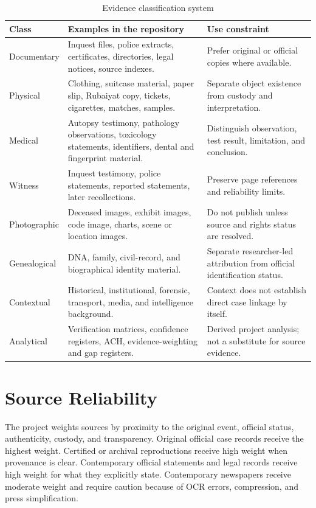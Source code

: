 \begin{table}[htbp]
\centering
\caption{Evidence classification system}
\label{tab:sources-evidence-classification}
\begin{tabularx}{\textwidth}{p{}X p{}}
\toprule
Class & Examples in the repository & Use constraint \\
\midrule
Documentary & Inquest files, police extracts, certificates, directories, legal notices, source indexes. & Prefer original or official copies where available. \\
Physical & Clothing, suitcase material, paper slip, Rubaiyat copy, tickets, cigarettes, matches, samples. & Separate object existence from custody and interpretation. \\
Medical & Autopsy testimony, pathology observations, toxicology statements, identifiers, dental and fingerprint material. & Distinguish observation, test result, limitation, and conclusion. \\
Witness & Inquest testimony, police statements, reported statements, later recollections. & Preserve page references and reliability limits. \\
Photographic & Deceased images, exhibit images, code image, charts, scene or location images. & Do not publish unless source and rights status are resolved. \\
Genealogical & DNA, family, civil-record, and biographical identity material. & Separate researcher-led attribution from official identification status. \\
Contextual & Historical, institutional, forensic, transport, media, and intelligence background. & Context does not establish direct case linkage by itself. \\
Analytical & Verification matrices, confidence registers, ACH, evidence-weighting and gap registers. & Derived project analysis; not a substitute for source evidence. \\
\bottomrule
\end{tabularx}
\end{table}

\section{Source Reliability}

The project weights sources by proximity to the original event, official status, authenticity, custody, and transparency. Original official case records receive the highest weight. Certified or archival reproductions receive high weight when provenance is clear. Contemporary official statements and legal records receive high weight for what they explicitly state. Contemporary newspapers receive moderate weight and require caution because of OCR errors, compression, and press simplification.

